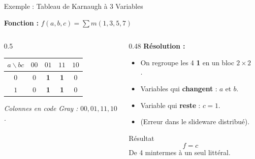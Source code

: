\begin{frame}{Exemple : Tableau de Karnaugh à 3 Variables}

    \textbf{Fonction :} \(f(a,b,c) = \sum m(1,3,5,7)\)

    \vspace{0.3cm}

    \begin{columns}[T]
        \begin{column}{0.5\textwidth}
            \centering
            \renewcommand{\arraystretch}{1.6}
            \begin{tabular}{|c|c|c|c|c|}
                \hline
                \(a \backslash bc\) & \(00\) & \(01\) & \(11\) & \(10\) \\
                \hline
                \(0\) & 0 & \textbf{1} & \textbf{1} & 0 \\
                \hline
                \(1\) & 0 & \textbf{1} & \textbf{1} & 0 \\
                \hline
            \end{tabular}

            \vspace{0.3cm}

            \textit{Colonnes en code Gray : \(00, 01, 11, 10\).}
        \end{column}
        \begin{column}{0.48\textwidth}
            \textbf{Résolution :}

            \vspace{0.3cm}

            \begin{itemize}
                \item On regroupe les 4 \textbf{1} en un bloc \(2 \times 2\).
                \item Variables qui \textbf{changent} : \(a\) et \(b\).
                \item Variable qui \textbf{reste} : \(c = 1\).
                \item {\color{red} (Erreur dans le slideware distribué).} 
            \end{itemize}

            \vspace{0.4cm}

            \begin{exampleblock}{Résultat}
                \[
                    f = c
                \]
                De 4 mintermes à un seul littéral.
            \end{exampleblock}
        \end{column}
    \end{columns}


\end{frame}

